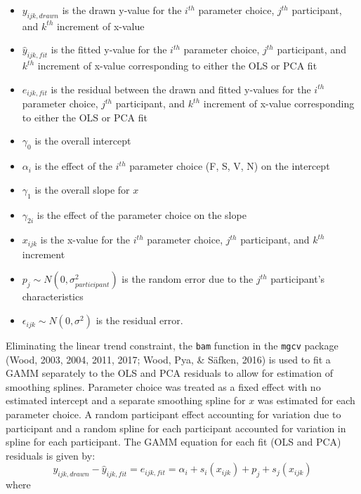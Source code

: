 \documentclass[print]{nuthesis}
\providecommand{\tightlist}{%
  \setlength{\itemsep}{0pt}\setlength{\parskip}{0pt}}
\begin{document}
\begin{itemize}
\tightlist
\item
  \(y_{ijk,drawn}\) is the drawn y-value for the \(i^{th}\) parameter choice, \(j^{th}\) participant, and \(k^{th}\) increment of x-value
\item
  \(\hat y_{ijk,fit}\) is the fitted y-value for the \(i^{th}\) parameter choice, \(j^{th}\) participant, and \(k^{th}\) increment of x-value corresponding to either the OLS or PCA fit
\item
  \(e_{ijk,fit}\) is the residual between the drawn and fitted y-values for the \(i^{th}\) parameter choice, \(j^{th}\) participant, and \(k^{th}\) increment of x-value corresponding to either the OLS or PCA fit
\item
  \(\gamma_0\) is the overall intercept
\item
  \(\alpha_i\) is the effect of the \(i^{th}\) parameter choice (F, S, V, N) on the intercept
\item
  \(\gamma_1\) is the overall slope for \(x\)
\item
  \(\gamma_{2i}\) is the effect of the parameter choice on the slope
\item
  \(x_{ijk}\) is the x-value for the \(i^{th}\) parameter choice, \(j^{th}\) participant, and \(k^{th}\) increment
\item
  \(p_{j} \sim N(0, \sigma^2_{participant})\) is the random error due to the \(j^{th}\) participant's characteristics
\item
  \(\epsilon_{ijk} \sim N(0, \sigma^2)\) is the residual error.
\end{itemize}

Eliminating the linear trend constraint, the \texttt{bam} function in the \texttt{mgcv} package (Wood, 2003, 2004, 2011, 2017; Wood, Pya, \& Säfken, 2016) is used to fit a GAMM separately to the OLS and PCA residuals to allow for estimation of smoothing splines.
Parameter choice was treated as a fixed effect with no estimated intercept and a separate smoothing spline for \(x\) was estimated for each parameter choice.
A random participant effect accounting for variation due to participant and a random spline for each participant accounted for variation in spline for each participant.
The GAMM equation for each fit (OLS and PCA) residuals is given by:
\begin{equation}
y_{ijk, drawn} - \hat y_{ijk, fit} = e_{ijk,fit} = \alpha_i + s_{i}(x_{ijk}) + p_{j} + s_{j}(x_{ijk})
\end{equation}
\noindent where
\end{document}
